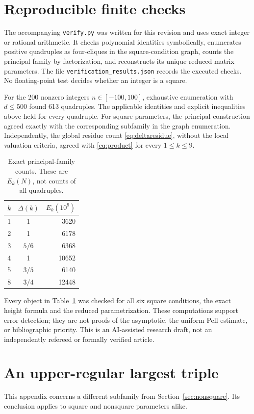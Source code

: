 \documentclass[11pt,a4paper]{article}
\numberwithin{equation}{section}
\theoremstyle{remark}
\begin{document}
\section{Reproducible finite checks}\label{sec:checks}
The accompanying \texttt{verify.py} was written for this revision and uses exact integer or rational arithmetic. It checks polynomial identities symbolically, enumerates positive quadruples as four-cliques in the square-condition graph, counts the principal family by factorization, and reconstructs its unique reduced matrix parameters. The file \texttt{verification\_results.json} records the executed checks. No floating-point test decides whether an integer is a square.

For the 200 nonzero integers $n\in[-100,100]$, exhaustive enumeration with $d\le500$ found 613 quadruples. The applicable identities and explicit inequalities above held for every quadruple. For square parameters, the principal construction agreed exactly with the corresponding subfamily in the graph enumeration. Independently, the global residue count \eqref{eq:deltaresidue}, without the local valuation criteria, agreed with \eqref{eq:product} for every $1\le k\le9$.

\begin{table}[ht]
\centering
\caption{Exact principal-family counts. These are $E_k(N)$, not counts of all quadruples.}\label{tab:counts}
\begin{tabular}{c@{\qquad}c@{\qquad}r}
\toprule
$k$&$\Delta(k)$&$E_k(10^9)$\\\midrule
1&1&3620\\2&1&6178\\3&$5/6$&6368\\4&1&10652\\5&$3/5$&6140\\8&$3/4$&12448\\\bottomrule
\end{tabular}
\end{table}
Every object in Table~\ref{tab:counts} was checked for all six square conditions, the exact height formula and the reduced parametrization. These computations support error detection; they are not proofs of the asymptotic, the uniform Pell estimate, or bibliographic priority. This is an AI-assisted research draft, not an independently refereed or formally verified article.

\appendix
\section{An upper-regular largest triple}\label{app:height}
This appendix concerns a different subfamily from Section~\ref{sec:nonsquare}. Its conclusion applies to square and nonsquare parameters alike.
\end{document}
